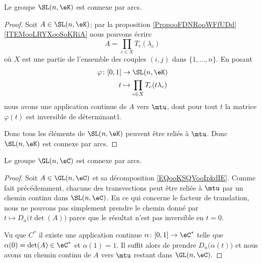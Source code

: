 \begin{proposition}     \label{PROPooALQCooLZCKrH}
    Le groupe \( \SL(n,\eK)\) est connexe par arcs.
\end{proposition}

\begin{proof}
    Soit \( A\in \SL(n,\eK)\); par la proposition \ref{PropooFDNRooWFfUDd}\ref{ITEMooLRYXooSoKRiA} nous pouvons écrire
    \begin{equation}
        A=\prod_{c\in X}T_c(\lambda_c)
    \end{equation}
    où \( X\) est une partie de l'ensemble des couples \( (i,j)\) dans \( \{ 1,\ldots, n \}\). En posant
    \begin{equation}
        \begin{aligned}
            \varphi\colon \mathopen[ 0 , 1 \mathclose]&\to \SL(n,\eK) \\
            t&\mapsto \prod_{c\in X}T_c(t\lambda_c) 
        \end{aligned}
    \end{equation}
    nous avons une application continue de \( A\) vers \( \mtu\), dont pour tout \( t\) la matrice \( \varphi(t)\) est inversible de déterminant\( 1\).

    Donc tous les éléments de \( \SL(n,\eK)\) peuvent être reliés à \( \mtu\). Donc \( \SL(n,\eK)\) est connexe par arcs.
\end{proof}

\begin{proposition}\label{PROPooVJNIooMByUJQ}
    Le groupe \( \GL(n,\eC)\) est connexe par arcs.
\end{proposition}

\begin{proof}
    Soit \( A\in\GL(n,\eC)\) et sa décomposition \eqref{EQooKSQVooIpkdIE}. Comme fait précédemment, chacune des transvections peut être reliée à \( \mtu\) par un chemin continu dans \( \SL(n,\eC)\). En ce qui concerne le facteur de translation,  nous ne pouvons pas simplement prendre le chemin donné par \( t\mapsto D_n\big( t\det(A) \big)\) parce que le résultat n'est pas inversible en \( t=0\).

    Vu que \( C^*\) il existe une application continue \( \alpha\colon \mathopen[ 0 , 1 \mathclose]\to \eC^*\) telle que \( \alpha(0)=\det(A)\in \eC^*\) et \( \alpha(1)=1\). Il suffit alors de prendre \( D_n\big( \alpha(t) \big)\) et nous avons un chemin continu de \( A\) vers \( \mtu\) restant dans \( \GL(n,\eC)\).
\end{proof}

